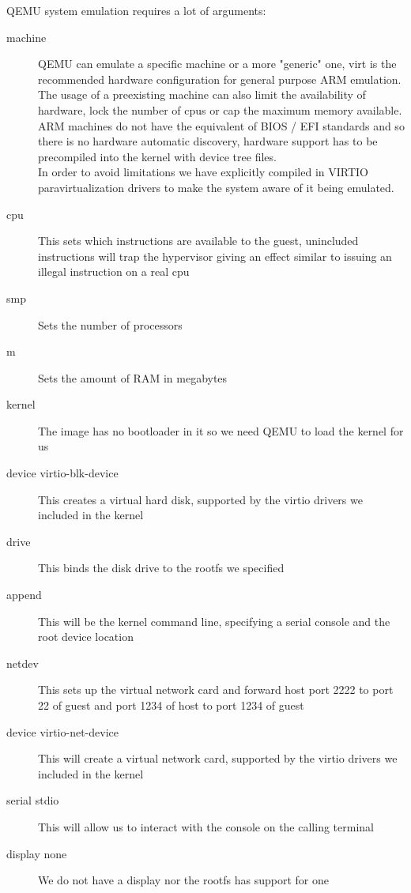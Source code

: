  {
  QEMU system emulation requires a lot of arguments:
  \begin{description}
    \item[machine] QEMU can emulate a specific machine or a more "generic" one,
      virt is the recommended hardware configuration for general purpose ARM emulation. \\
      The usage of a preexisting machine can also limit the availability of hardware, lock the number of cpus or cap the maximum memory available. \\
      ARM machines do not have the equivalent of BIOS / EFI standards and so there is no hardware automatic discovery, hardware support has to be precompiled into the kernel with device tree files. \\
      In order to avoid limitations we have explicitly compiled in VIRTIO paravirtualization drivers to make the system aware of it being emulated.
    \item[cpu] This sets which instructions are available to the guest,
      unincluded instructions will trap the hypervisor giving an effect similar to issuing an illegal instruction on a real cpu
    \item[smp] Sets the number of processors
    \item[m] Sets the amount of RAM in megabytes
    \item[kernel] The image has no bootloader in it so we need QEMU to load the kernel for us
    \item[device virtio-blk-device] This creates a virtual hard disk, supported by the virtio drivers we included in the kernel
    \item[drive] This binds the disk drive to the rootfs we specified
    \item[append] This will be the kernel command line, specifying a serial console and the root device location
    \item[netdev] This sets up the virtual network card and forward host port 2222 to port 22 of guest and port 1234 of host to port 1234 of guest
    \item[device virtio-net-device] This will create a virtual network card, supported by the virtio drivers we included in the kernel
    \item[serial stdio] This will allow us to interact with the console on the calling terminal
    \item[display none] We do not have a display nor the rootfs has support for one
  \end{description}
}

